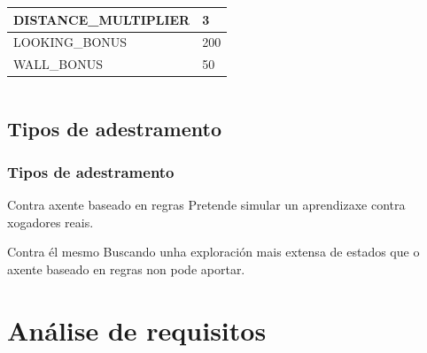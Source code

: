 \documentclass{beamer}
\begin{document}
\begin{frame}
\begin{columns}
\begin{column}{5cm}
{\begin{minipage}{1.6\linewidth}
\begin{table}
\begin{center}
\begin{tabular}{|l|l|}
			\hline
			DISTANCE\_MULTIPLIER& 3\\
			
			\hline
			LOOKING\_BONUS& 200\\
			
			\hline
			WALL\_BONUS& 50\\
			
			\hline
		\end{tabular}
		\label{algoritmo:valores}
	\end{center}
\end{table}
\end{minipage}	
}
	\end{column}

\end{columns}


\note{
	
}

\end{frame}


\subsection{Tipos de adestramento}
\begin{frame}
\frametitle{Tipos de adestramento} 

\begin{block}{Contra axente baseado en regras} %
	Pretende simular un aprendizaxe contra xogadores reais.
\end{block}

\begin{block}{Contra él mesmo}
	Buscando unha exploración mais extensa de estados que o axente baseado en regras non pode aportar.
\end{block}
\note{

}
\end{frame}



\section{Análise de requisitos}
\end{document}
